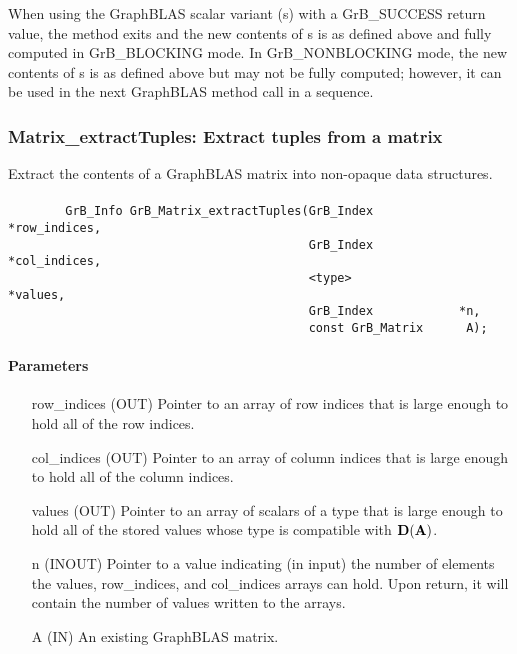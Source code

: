 When using the GraphBLAS scalar variant ({\sf s}) with a {\sf GrB\_SUCCESS} return value,
the method exits and the new contents of {\sf s} is as defined above
and fully computed in {\sf GrB\_BLOCKING} mode. In {\sf GrB\_NONBLOCKING} mode, the 
new contents of {\sf s} is as defined above but may not be fully computed; however, 
it can be used in the next GraphBLAS method call in a sequence.



\subsubsection{{\sf Matrix\_extractTuples}: Extract tuples from a matrix}
\label{Sec:Matrix_extractTuples}

Extract the contents of a GraphBLAS matrix into non-opaque data structures.

\paragraph{\syntax}

\begin{verbatim}
        GrB_Info GrB_Matrix_extractTuples(GrB_Index            *row_indices,
                                          GrB_Index            *col_indices,
                                          <type>               *values, 
                                          GrB_Index            *n, 
                                          const GrB_Matrix      A);
\end{verbatim}

\paragraph{Parameters}

\begin{itemize}[leftmargin=1.1in]
    \item[{\sf row\_indices}] ({\sf OUT}) Pointer to an array of row indices
                        that is large enough to hold all of the row indices.
    \item[{\sf col\_indices}] ({\sf OUT}) Pointer to an array of column indices
                        that is large enough to hold all of the column indices. 
    \item[{\sf values}] ({\sf OUT}) Pointer to an array of scalars of a type
                        that is large enough to hold all of the stored values whose
                        type is compatible with $\mathbf{D}({\bf A})$.
    \item[{\sf n}] ({\sf INOUT}) Pointer to a value indicating (in input) the number of
                        elements the {\sf values}, {\sf row\_indices}, and
                        {\sf col\_indices} arrays can hold. Upon return, it will contain the
                        number of values written to the arrays.
    \item[{\sf A}]      ({\sf IN}) An existing GraphBLAS matrix.
\end{itemize}

